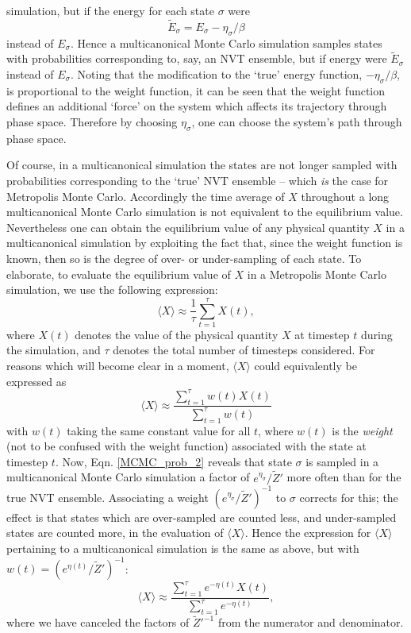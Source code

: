 \documentclass{report}
\begin{document}
simulation, but if the energy for each state $\sigma$ were 
\begin{equation}
\tilde{E}_{\sigma}=E_{\sigma}-\eta_{\sigma}/\beta
\end{equation}
instead of $E_{\sigma}$. Hence a multicanonical Monte Carlo simulation samples states with probabilities corresponding to, say, an NVT ensemble,
but if energy were $\tilde{E}_{\sigma}$ instead of $E_{\sigma}$. Noting that the modification to the `true' energy function, $-\eta_{\sigma}/\beta$, is
proportional to the weight function, it can be seen that the weight function defines an additional `force' on the system which affects its
trajectory through phase space. Therefore by choosing $\eta_{\sigma}$, one can choose the system's path through phase space. 

Of course, in a multicanonical simulation the states are not longer sampled with probabilities corresponding to the `true' NVT ensemble -- 
which \emph{is} the case for Metropolis Monte Carlo. Accordingly the time average of $X$ throughout a long multicanonical Monte Carlo simulation is 
not equivalent to the equilibrium value. Nevertheless one can obtain the equilibrium value of any physical quantity $X$ in a multicanonical 
simulation by exploiting the fact that, since the weight function is known, then so is the degree of over- or under-sampling of each state. To 
elaborate, to evaluate the equilibrium value of $X$ in a Metropolis Monte Carlo simulation, we use the following expression:
\begin{equation}
\langle X\rangle\approx\frac{1}{\tau}\sum_{t=1}^{\tau}X(t),
\end{equation}
where $X(t)$ denotes the value of the physical quantity $X$ at timestep $t$ during the simulation, and $\tau$ denotes the total number of timesteps
considered. For reasons which will become clear in a moment, $\langle X\rangle$ could equivalently be expressed as
\begin{equation}
\langle X\rangle\approx\frac{\displaystyle\sum_{t=1}^{\tau}w(t)X(t)}{\displaystyle\sum_{t=1}^{\tau}w(t)}
\end{equation}
with $w(t)$ taking the same constant value for all $t$, where $w(t)$ is the \emph{weight} (not to be confused with the weight function) associated 
with the state at timestep $t$.
Now, Eqn. \eqref{MCMC_prob_2} reveals that state $\sigma$ is sampled in a multicanonical Monte Carlo simulation a factor of
$e^{\eta_{\sigma}}/\tilde{Z}'$ more often than for the true NVT ensemble. Associating a weight $(e^{\eta_{\sigma}}/\tilde{Z}')^{-1}$ to $\sigma$ corrects for
this; the effect is that states which are over-sampled are counted less, and under-sampled states are counted more, in the evaluation of $\langle X\rangle$.
Hence the expression for $\langle X\rangle$ pertaining to a multicanonical simulation is the same as above, but with $w(t)=(e^{\eta(t)}/\tilde{Z}')^{-1}$:
\begin{equation}\label{equilX_MCMC}
\langle X\rangle\approx\frac{\displaystyle\sum_{t=1}^{\tau}e^{-\eta(t)}X(t)}{\displaystyle\sum_{t=1}^{\tau}e^{-\eta(t)}},
\end{equation}
where we have canceled the factors of $\tilde{Z}'^{-1}$ from the numerator and denominator.
\end{document}
